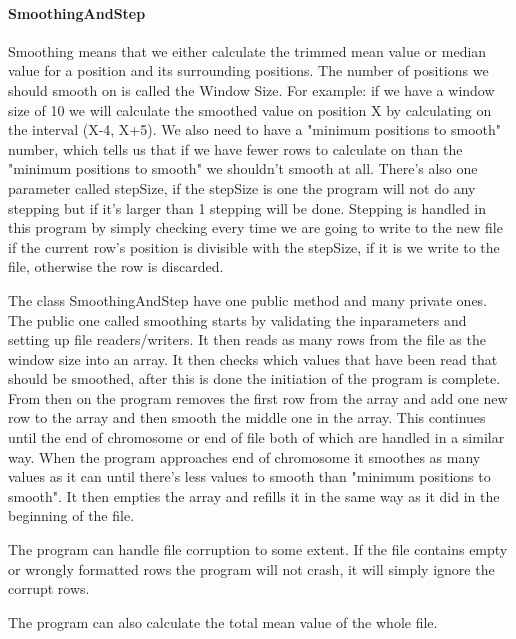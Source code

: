 \paragraph{SmoothingAndStep}
Smoothing means that we either calculate the trimmed mean value or median value for a position and its surrounding positions. The number of positions we should smooth on is called the Window Size. For example: if we have a window size of 10 we will calculate the smoothed value on position X by calculating on the interval (X-4, X+5). We also need to have a "minimum positions to smooth" number, which tells us that if we have fewer rows to calculate on than the "minimum positions to smooth" we shouldn't smooth at all. There's also one parameter called stepSize, if the stepSize is one the program will not do any stepping but if it's larger than 1 stepping will be done. Stepping is handled in this program by simply checking every time we are going to write to the new file if the current row's position is divisible with the stepSize, if it is we write to the file, otherwise the row is discarded.

The class SmoothingAndStep have one public method and many private ones. The public one called smoothing starts by validating the inparameters and setting up file readers/writers. It then reads as many rows from the file as the window size into an array. It then checks which values that have been read that should be smoothed, after this is done the initiation of the program is complete. From then on the program removes the first row from the array and add one new row to the array and then smooth the middle one in the array. This continues until the end of chromosome or end of file both of which are handled in a similar way. When the program approaches end of chromosome it smoothes as many values as it can until there's less values to smooth than "minimum positions to smooth". It then empties the array and refills it in the same way as it did in the beginning of the file.

The program can handle file corruption to some extent. If the file contains empty or wrongly formatted rows the program will not crash, it will simply ignore the corrupt rows.

The program can also calculate the total mean value of the whole file.



